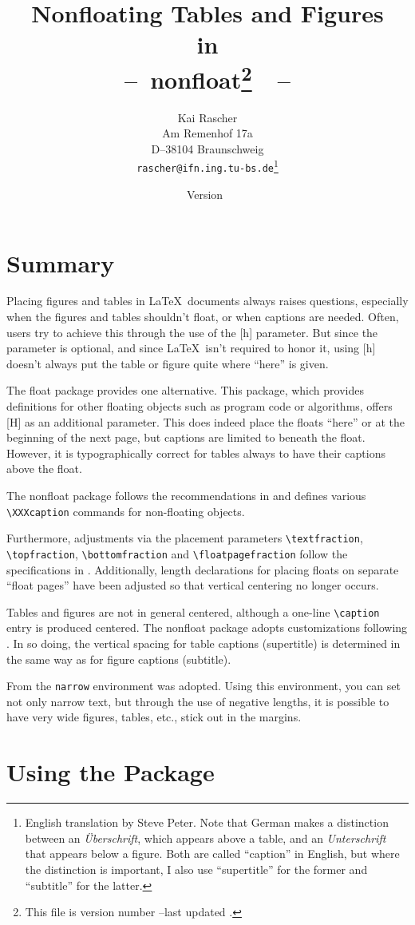 \documentclass{article}
\title{ Nonfloating Tables and Figures\\
        in \LaTeXe\\
        --~nonfloat\thanks{This file is version number \fileversion\---last updated \filedate.}~~--}
\author{ Kai Rascher\\
         Am Remenhof 17a\\
         D--38104 Braunschweig\\
         {\tt rascher@ifn.ing.tu-bs.de}\thanks{English translation by Steve Peter. Note that German makes a distinction between an \textit{\"Uberschrift}, which appears above a table, and an \textit{Unterschrift} that appears below a figure. Both are called ``caption'' in English, but where the distinction is important, I also use ``supertitle'' for the former and ``subtitle'' for the latter.}}
\date{Version~\fileversion}
\begin{document}
\maketitle

\section{Summary}

Placing figures and tables in \LaTeX\ documents always raises questions, especially when the figures and tables shouldn't float, or when captions are needed. Often, users try to achieve this through the use of the [h] parameter. But since the parameter is optional, and since \LaTeX\ isn't required to honor it, using [h] doesn't always put the table or figure quite where ``here'' is given. 

The \textsf{float} package provides one alternative. This package, which provides definitions for other floating objects such as program code or algorithms, offers [H] as an additional parameter. This does indeed place the floats ``here'' or at the beginning of the next page, but captions are limited to beneath the float. However, it is typographically correct for tables always to have their captions above the float.

The \textsf{nonfloat} package follows the recommendations in \cite{epslatex,Reichert}
and defines various \verb|\XXXcaption| commands for non-floating objects.

Furthermore, adjustments via the placement parameters \verb|\textfraction|,
\verb|\topfraction|, \verb|\bottomfraction| and \verb|\floatpagefraction| follow the specifications
in \cite{epslatex}. Additionally, length declarations for placing floats on separate ``float pages'' have been adjusted so that vertical centering no longer occurs.

Tables and figures are not in general centered, although a one-line \verb|\caption| entry is produced centered.  The \textsf{nonfloat} package adopts customizations following \cite{Reichert2}. In so doing, the vertical spacing for table captions (supertitle) is determined in the same way as for figure captions (subtitle).

From \cite{epslatex} the \verb|narrow| environment was adopted. Using this environment, you can
set not only narrow text, but through the use of negative lengths, it is possible to have very wide figures, tables, etc., stick out in the margins.

\section{Using the Package}
\end{document}
